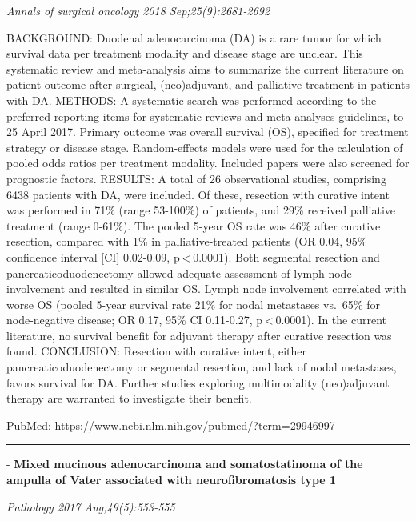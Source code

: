 \documentclass[]{article}
\begin{document}
\emph{Annals of surgical oncology 2018 Sep;25(9):2681-2692}

BACKGROUND: Duodenal adenocarcinoma (DA) is a rare tumor for which
survival data per treatment modality and disease stage are unclear. This
systematic review and meta-analysis aims to summarize the current
literature on patient outcome after surgical, (neo)adjuvant, and
palliative treatment in patients with DA. METHODS: A systematic search
was performed according to the preferred reporting items for systematic
reviews and meta-analyses guidelines, to 25 April 2017. Primary outcome
was overall survival (OS), specified for treatment strategy or disease
stage. Random-effects models were used for the calculation of pooled
odds ratios per treatment modality. Included papers were also screened
for prognostic factors. RESULTS: A total of 26 observational studies,
comprising 6438 patients with DA, were included. Of these, resection
with curative intent was performed in 71\% (range 53-100\%) of patients,
and 29\% received palliative treatment (range 0-61\%). The pooled 5-year
OS rate was 46\% after curative resection, compared with 1\% in
palliative-treated patients (OR 0.04, 95\% confidence interval {[}CI{]}
0.02-0.09, p \textless{} 0.0001). Both segmental resection and
pancreaticoduodenectomy allowed adequate assessment of lymph node
involvement and resulted in similar OS. Lymph node involvement
correlated with worse OS (pooled 5-year survival rate 21\% for nodal
metastases vs.~65\% for node-negative disease; OR 0.17, 95\% CI
0.11-0.27, p \textless{} 0.0001). In the current literature, no survival
benefit for adjuvant therapy after curative resection was found.
CONCLUSION: Resection with curative intent, either
pancreaticoduodenectomy or segmental resection, and lack of nodal
metastases, favors survival for DA. Further studies exploring
multimodality (neo)adjuvant therapy are warranted to investigate their
benefit.

PubMed: \url{https://www.ncbi.nlm.nih.gov/pubmed/?term=29946997}

{}

{}

\begin{center}\rule{0.5\linewidth}{\linethickness}\end{center}

 - \textbf{Mixed mucinous adenocarcinoma and somatostatinoma of the
ampulla of Vater associated with neurofibromatosis type 1}

\emph{Pathology 2017 Aug;49(5):553-555}
\end{document}
